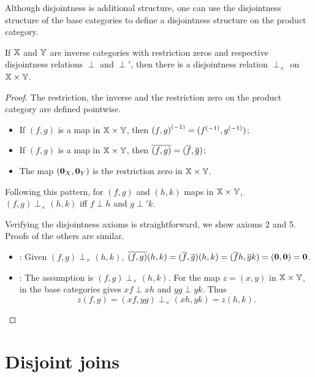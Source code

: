 Although disjointness is additional structure, one can use the disjointness structure of the base
categories to define a disjointness structure on the product category.

\begin{lemma}\label{lem:disjointness_is_derivable_on_a_product_category}
  If $\mathbb{X}$ and $\mathbb{Y}$ are inverse categories with restriction zeros and respective disjointness
  relations $\perp$ and $\perp'$, then there is a disjointness relation
  $\perp_{\times}$ on $\mathbb{X}\times\mathbb{Y}$.
\end{lemma}
\begin{proof}
  The restriction, the inverse and the restriction zero on the product category are defined pointwise.
  \begin{itemize}
    \item If $(f,g)$ is a map in $\mathbb{X}\times\mathbb{Y}$, then ${(f,g)}^{(-1)} = ({f}^{(-1)}, {g}^{(-1)})$;
    \item If $(f,g)$ is a map in $\mathbb{X}\times\mathbb{Y}$, then $\overline{(f,g)} = (\overline{f}, \overline{g})$;
    \item The map $(\mathbf{0}_X,\mathbf{0}_Y)$ is the restriction zero in $\mathbb{X}\times\mathbb{Y}$.
  \end{itemize}

  Following this pattern, for $(f,g)$ and $(h,k)$ maps in $\mathbb{X}\times\mathbb{Y}$, $(f,g) \perp_{\times}(h,k)$
  iff $f\perp h$ and $g\perp' k$.

  Verifying the disjointness axioms is straightforward, we show axioms 2 and 5. Proofs of the
  others are similar.
  {
  \begin{itemize}
    \item [\axiom{Dis}{2}]: Given $(f,g)\perp_{\times}(h,k)$,
      $\overline{(f,g)}(h,k) =  (\overline{f},\overline{g})(h,k) = (\overline{f} h, \overline{g} k) = (\mathbf{0}, \mathbf{0}) = \mathbf{0}$.
    \item [\axiom{Dis}{5}]: The assumption is $(f,g)\perp_{\times}(h,k)$. For the map $z = (x,y)$
      in $\mathbb{X} \times \mathbb{Y}$,  in the base categories gives $x f \perp x h$ and $y g \perp
      y k$. Thus
      \[
        z(f,g) = (x f, y g) \perp_{\times} (x h, y k) = z(h,k).
      \]
  \end{itemize}
  }
\end{proof}

\section{Disjoint joins} %
\label{sec:disjoint_joins}

